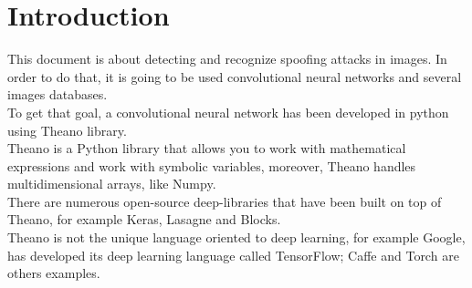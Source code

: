 \section{Introduction}
This document is about detecting and recognize spoofing attacks in images. In order to do that, it is going to be used convolutional neural networks and several images databases.\\

To get that goal, a convolutional neural network has been developed in python using Theano library.\\

Theano is a Python library that allows you to work with mathematical expressions and work with symbolic variables, moreover, Theano handles multidimensional arrays, like Numpy.\\

There are numerous open-source deep-libraries that have been built on top of Theano, for example Keras, Lasagne and Blocks.\\

Theano is not the unique language oriented to deep learning, for example Google, has developed its deep learning language called TensorFlow; Caffe and Torch are others examples.\\
